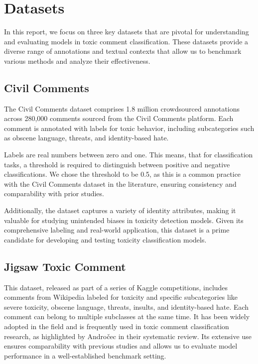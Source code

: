\section{Datasets}
In this report, we focus on three key datasets that are pivotal for understanding and evaluating models in toxic comment classification. These datasets provide a diverse range of annotations and textual contexts that allow us to benchmark various methods and analyze their effectiveness.

\subsection{Civil Comments}
The Civil Comments dataset comprises 1.8 million crowdsourced annotations across 280,000 comments sourced from the Civil Comments platform. Each comment is annotated with labels for toxic behavior, including subcategories such as obscene language, threats, and identity-based hate.

Labels are real numbers between zero and one. This means, that for classification tasks, a threshold is required to distinguish between positive and negative classifications. We chose the threshold to be 0.5, as this is a common practice with the Civil Comments dataset in the literature, ensuring consistency and comparability with prior studies. \cite{jigsaw2019, Duchene2023}

Additionally, the dataset captures a variety of identity attributes, making it valuable for studying unintended biases in toxicity detection models. Given its comprehensive labeling and real-world application, this dataset is a prime candidate for developing and testing toxicity classification models.~\cite{jigsaw2019}

\subsection{Jigsaw Toxic Comment}
This dataset, released as part of a series of Kaggle competitions, includes comments from Wikipedia labeled for toxicity and specific subcategories like severe toxicity, obscene language, threats, insults, and identity-based hate. Each comment can belong to multiple subclasses at the same time. It has been widely adopted in the field and is frequently used in toxic comment classification research, as highlighted by Andročec in their systematic review. Its extensive use ensures comparability with previous studies and allows us to evaluate model performance in a well-established benchmark setting.~\cite{Androcec2020, jigsaw2017}


